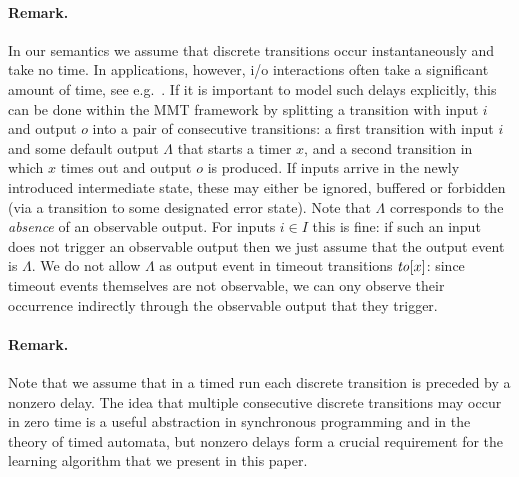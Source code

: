 \paragraph{Remark.}
In our semantics we assume that discrete transitions occur instantaneously and take no time. In applications, however, i/o interactions
often take a significant amount of time, see e.g.\  \cite{SHV16}. If it is important to model such delays
explicitly, this can be done within the MMT framework by splitting a transition with input $i$ and output $o$ into
a pair of consecutive transitions: a first transition with input $i$ and some default output $\Lambda$ that starts
a timer $x$, and a second transition in which $x$ times out and output $o$ is produced.
If inputs arrive in the newly introduced intermediate state, these may either be ignored, buffered or forbidden
(via a transition to some designated error state).
Note that $\Lambda$ corresponds to the \emph{absence} of an observable output. For inputs $i \in I$ this is fine: if such
an input does not trigger an observable output then we just assume that the output event is $\Lambda$. We do not allow
$\Lambda$ as output event in timeout transitions $\mathit{to}[x]$: since timeout events themselves are not observable, we can ony observe their occurrence indirectly through the observable output that they trigger.
\fi

\paragraph{Remark.}
Note that we assume that in a timed run each discrete transition is preceded by a nonzero delay.
The idea that multiple consecutive discrete transitions may occur in zero time is a useful abstraction in synchronous
programming and in the theory of timed automata, but nonzero delays form
a crucial requirement for the learning algorithm that we present in this paper.

